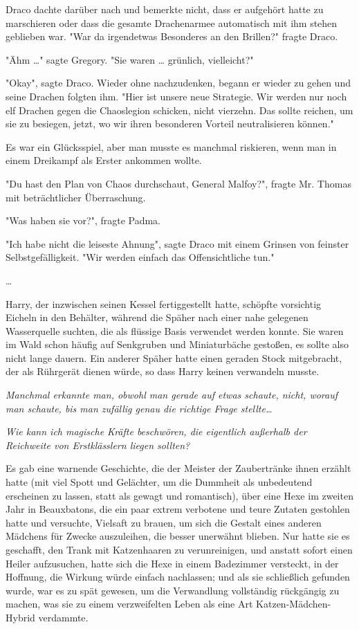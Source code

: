 {Draco dachte darüber nach und bemerkte nicht, dass er aufgehört hatte zu marschieren oder dass die gesamte Drachenarmee automatisch mit ihm stehen geblieben war. "War da irgendetwas Besonderes an den Brillen?" fragte Draco.

"Ähm …" sagte Gregory. "Sie waren … grünlich, vielleicht?"

"Okay", sagte Draco. Wieder ohne nachzudenken, begann er wieder zu gehen und seine Drachen folgten ihm. "Hier ist unsere neue Strategie. Wir werden nur noch elf Drachen gegen die Chaoslegion schicken, nicht vierzehn. Das sollte reichen, um sie zu besiegen, jetzt, wo wir ihren besonderen Vorteil neutralisieren können."

Es war ein Glücksspiel, aber man musste es manchmal riskieren, wenn man in einem Dreikampf als Erster ankommen wollte.

"Du hast den Plan von Chaos durchschaut, General Malfoy?", fragte Mr. Thomas mit beträchtlicher Überraschung.

"Was haben sie vor?", fragte Padma.

"Ich habe nicht die leiseste Ahnung", sagte Draco mit einem Grinsen von feinster Selbstgefälligkeit. "Wir werden einfach das Offensichtliche tun."

…

Harry, der inzwischen seinen Kessel fertiggestellt hatte, schöpfte vorsichtig Eicheln in den Behälter, während die Späher nach einer nahe gelegenen Wasserquelle suchten, die als flüssige Basis verwendet werden konnte. Sie waren im Wald schon häufig auf Senkgruben und Miniaturbäche gestoßen, es sollte also nicht lange dauern. Ein anderer Späher hatte einen geraden Stock mitgebracht, der als Rührgerät dienen würde, so dass Harry keinen verwandeln musste.

\emph{Manchmal erkannte man, obwohl man gerade auf etwas schaute, nicht, worauf man schaute, bis man zufällig genau die richtige Frage stellte…}

\emph{Wie kann ich magische Kräfte beschwören, die eigentlich außerhalb der Reichweite von Erstklässlern liegen sollten?}

Es gab eine warnende Geschichte, die der Meister der Zaubertränke ihnen erzählt hatte (mit viel Spott und Gelächter, um die Dummheit als unbedeutend erscheinen zu lassen, statt als gewagt und romantisch), über eine Hexe im zweiten Jahr in Beauxbatons, die ein paar extrem verbotene und teure Zutaten gestohlen hatte und versuchte, Vielsaft zu brauen, um sich die Gestalt eines anderen Mädchens für Zwecke auszuleihen, die besser unerwähnt blieben. Nur hatte sie es geschafft, den Trank mit Katzenhaaren zu verunreinigen, und anstatt sofort einen Heiler aufzusuchen, hatte sich die Hexe in einem Badezimmer versteckt, in der Hoffnung, die Wirkung würde einfach nachlassen; und als sie schließlich gefunden wurde, war es zu spät gewesen, um die Verwandlung vollständig rückgängig zu machen, was sie zu einem verzweifelten Leben als eine Art Katzen-Mädchen-Hybrid verdammte.

}
